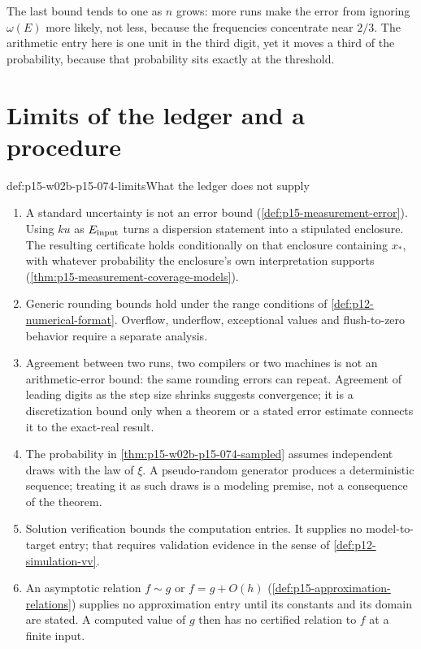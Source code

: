 The last bound tends to one as \(n\) grows: more runs make the error
from ignoring \(\omega(E)\) more likely, not less, because the
frequencies concentrate near \(2/3\). The arithmetic entry here is
one unit in the third digit, yet it moves a third of the probability,
because that probability sits exactly at the threshold.

\section{Limits of the ledger and a procedure}
\label{sec:p15-w02b-p15-074-limits}

\begin{hbwarning}{def:p15-w02b-p15-074-limits}{What the ledger does not supply}
\begin{enumerate}
\item A standard uncertainty is not an error bound
(\cref{def:p15-measurement-error}). Using \(ku\) as \(E_{\rm input}\)
turns a dispersion statement into a stipulated enclosure. The resulting
certificate holds conditionally on that enclosure containing \(x_*\), with
whatever probability the enclosure's own interpretation supports
(\cref{thm:p15-measurement-coverage-models}).
\item Generic rounding bounds hold under the range conditions of
\cref{def:p12-numerical-format}. Overflow, underflow, exceptional values
and flush-to-zero behavior require a separate analysis.
\item Agreement between two runs, two compilers or two machines is not an
arithmetic-error bound: the same rounding errors can repeat. Agreement of
leading digits as the step size shrinks suggests convergence; it is a
discretization bound only when a theorem or a stated error estimate
connects it to the exact-real result.
\item The probability in \cref{thm:p15-w02b-p15-074-sampled} assumes
independent draws with the law of \(\xi\). A pseudo-random generator
produces a deterministic sequence; treating it as such draws is a modeling
premise, not a consequence of the theorem.
\item Solution verification bounds the computation entries. It supplies no
model-to-target entry; that requires validation evidence in the sense of
\cref{def:p12-simulation-vv}.
\item An asymptotic relation \(f\sim g\) or \(f=g+O(h)\)
(\cref{def:p15-approximation-relations}) supplies no approximation entry
until its constants and its domain are stated. A computed value of \(g\)
then has no certified relation to \(f\) at a finite input.
\end{enumerate}
\end{hbwarning}

